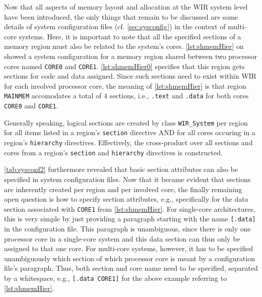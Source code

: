 Now that all aspects of memory layout and allocation at the \gls{WIR} system level have been introduced, the only things that remain to be discussed are some details of system configuration files (cf. \cref{sec:sysconfig}) in the context of multi-core systems.
Here, it is important to note that all the specified sections of a memory region must also be related to the system's cores.
\cref{lst:shmemHier} on  showed a system configuration for a memory region shared between two processor cores named \texttt{CORE0} and \texttt{CORE1}.
\cref{lst:shmemHier0} specifies that this region gets sections for code and data assigned.
Since such sections need to exist within \gls{WIR} for each involved processor core, the meaning of \cref{lst:shmemHier} is that region \texttt{MAINMEM} accomodates a total of 4 sections, i.e., \texttt{.text} and \texttt{.data} for both cores \texttt{CORE0} and \texttt{CORE1}.

Generally speaking, logical sections are created by class \texttt{WIR\_System} per region for all items listed in a region's \texttt{section} directive AND for all cores occuring in a region's \texttt{hierarchy} directives.
Effectively, the cross-product over all sections and cores from a region's \texttt{section} and \texttt{hierarchy} directives is constructed.

\cref{tab:sysconf2} furthermore revealed that basic section attributes can also be specified in system configuration files.
Now that it became evident that sections are inherently created per region and per involved core, the finally remaining open question is how to specify section attributes, e.g., specifically for the data section associated with \texttt{CORE1} from \cref{lst:shmemHier}.
For single-core architectures, this is very simple by just providing a paragraph starting with the name \texttt{[.data]} in the configuration file.
This paragraph is unambiguous, since there is only one processor core in a single-core system and this data section can thus only be assigned to that one core.
For multi-core systems, however, it has to be specified unambiguously which section of which processor core is meant by a configuration file's paragraph.
Thus, both section and core name need to be specified, separated by a whitespace, e.g., \texttt{[.data CORE1]} for the above example referring to \cref{lst:shmemHier}.


\cleardoubleoddpage
